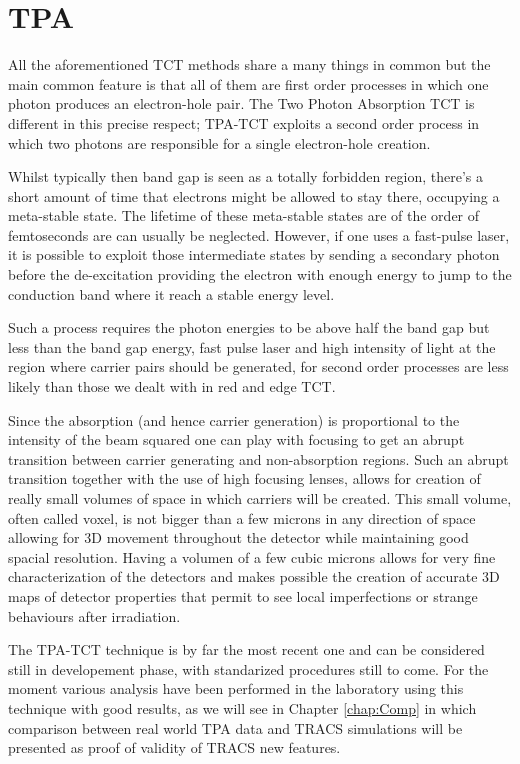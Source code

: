 \section{TPA} %
\label{sec:results_and_comparison_with_tracs_rad}

All the aforementioned TCT methods share a many things in common but the main common feature is that all of them are first order processes in which one photon produces an electron-hole pair. The Two Photon Absorption TCT is different in this precise respect; TPA-TCT exploits a second order process in which two photons are responsible for a single electron-hole creation.

Whilst typically then band gap is seen as a totally forbidden region, there's a short amount of time that electrons might be allowed to stay there, occupying a meta-stable state. The lifetime of these meta-stable states are of the order of femtoseconds are can usually be neglected. However, if one uses a fast-pulse laser, it is possible to exploit those intermediate states by sending a secondary photon before the de-excitation providing the electron with enough energy to jump to the conduction band where it reach a stable energy level.

Such a process requires the photon energies to be above half the band gap but less than the band gap energy, fast pulse laser and high intensity of light at the region where carrier pairs should be generated, for second order processes are less likely than those we dealt with in red and edge TCT.

Since the absorption (and hence carrier generation) is proportional to the intensity of the beam squared one can play with focusing to get an abrupt transition between carrier generating and non-absorption regions. Such an abrupt transition together with the use of high focusing lenses, allows for creation of really small volumes of space in which carriers will be created. 
 This small volume, often called voxel, is not bigger than a few microns in any direction of space allowing for 3D movement throughout the detector while maintaining good spacial resolution. Having a volumen of a few cubic microns allows for very fine characterization of the detectors and makes possible the creation of accurate 3D maps of detector properties that permit to see local imperfections or strange behaviours after irradiation.

 The TPA-TCT technique is by far the most recent one and can be considered still in developement phase, with standarized procedures still to come. For the moment various analysis have been performed in the laboratory using this technique with good results, as we will see in Chapter \ref{chap:Comp} in which comparison between real world TPA data and TRACS simulations will be presented as proof of validity of TRACS new features.

